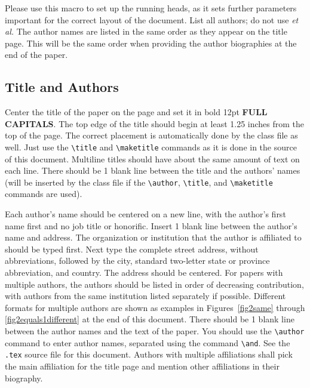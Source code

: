 \documentclass{scspaperproc}
\theoremstyle{scsthe}
\begin{document}
Please use this macro to set up the running heads, as it sets further parameters important for the correct layout of the document. List all authors; do not use \textit{et al.} The author names are listed in the same order as they appear on the title page. This will be the same order when providing the author biographies at the end of the paper.


\subsection{Title and Authors}

Center the title of the paper on the page and set it in bold 12pt \textbf{\uppercase{full capitals}}. The top edge of the title should begin at least 1.25 inches from the top of the page. The correct placement is automatically done by the class file as well. Just use the \verb+\title+ and \verb+\maketitle+ commands as it is done in the source of this document. Multiline titles should have about the same amount of text on each line. There should be 1 blank line between the title and the authors’ names (will be inserted by the class file if the \verb+\author+, \verb+\title+, and \verb+\maketitle+ commands are used).

Each author’s name should be centered on a new line, with the author’s first name first and no job title or honorific. Insert 1 blank line between the author’s name and address. The organization or institution that the author is affiliated to should be typed first. Next type the complete street address, without abbreviations, followed by the city, standard two-letter state or province abbreviation, and country. The address should be centered. For papers with multiple authors, the authors should be listed in order of decreasing contribution, with authors from the same institution listed separately if possible. Different formats for multiple authors are shown as examples in Figures~\ref{fig2same} through \ref{fig2equals1different} at the end of this document. There should be 1 blank line between the author names and the text of the paper. You should use the \verb+\author+ command to enter author names, separated using the command \verb+\and+. See the \texttt{.tex} source file for this document. Authors with multiple affiliations shall pick the main affiliation for the title page and mention other affiliations in their biography.
\end{document}
